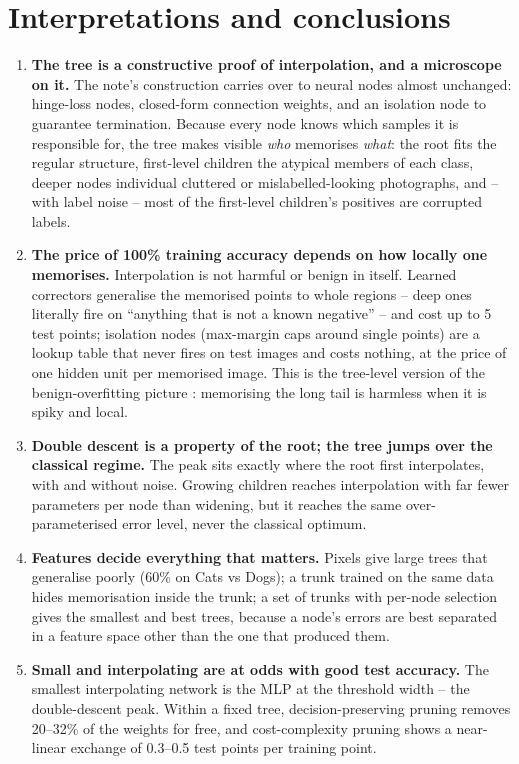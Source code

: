 \section{Interpretations and conclusions}
\label{sec:conc}

\begin{enumerate}[leftmargin=*]
\item \textbf{The tree is a constructive proof of interpolation, and a microscope on it.} The note's
  construction carries over to neural nodes almost unchanged: hinge-loss nodes, closed-form
  connection weights, and an isolation node to guarantee termination. Because every node knows which
  samples it is responsible for, the tree makes visible \emph{who} memorises \emph{what}: the root
  fits the regular structure, first-level children the atypical members of each class, deeper nodes
  individual cluttered or mislabelled-looking photographs, and -- with label noise -- most of the first-level children's positives are corrupted labels.
\item \textbf{The price of 100\% training accuracy depends on how locally one memorises.}
  Interpolation is not harmful or benign in itself. Learned correctors generalise the memorised
  points to whole regions -- deep ones literally fire on ``anything that is not a known negative'' --
  and cost up to 5 test points; isolation nodes (max-margin caps around single
  points) are a lookup table that never fires on test images and costs nothing, at the price of one
  hidden unit per memorised image. This is the tree-level version of the benign-overfitting picture
  \cite{bartlett,feldman}: memorising the long tail is harmless when it is spiky and local.
\item \textbf{Double descent is a property of the root; the tree jumps over the classical regime.}
  The peak sits exactly where the root first interpolates, with and without noise. Growing children
  reaches interpolation with far fewer parameters per node than widening, but it reaches the same
  over-parameterised error level, never the classical optimum.
\item \textbf{Features decide everything that matters.} Pixels give large trees that generalise poorly
  (60\% on Cats vs Dogs); a trunk trained on the same data hides memorisation inside the trunk;
  a set of trunks with per-node selection gives the smallest and best trees, because a node's errors
  are best separated in a feature space other than the one that produced them.
\item \textbf{Small and interpolating are at odds with good test accuracy.} The smallest
  interpolating network is the MLP at the threshold width -- the double-descent peak. Within a fixed
  tree, decision-preserving pruning removes 20--32\% of the weights for free, and cost-complexity
  pruning shows a near-linear exchange of 0.3--0.5 test points per training point.
\end{enumerate}

